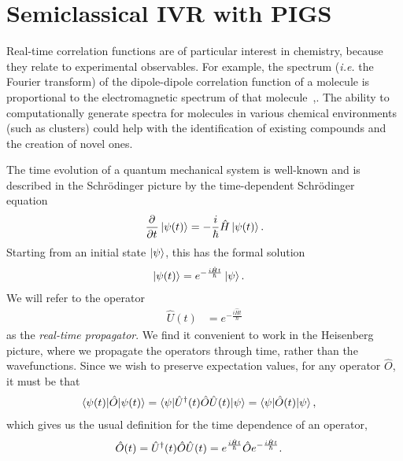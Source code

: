 \chapter{Semiclassical IVR with PIGS}

\label{chap:semiclassical}

Real-time correlation functions are of particular interest in chemistry, because they relate to experimental observables.
For example, the spectrum (\textit{i.e.} the Fourier transform) of the dipole-dipole correlation function of a molecule is proportional to the electromagnetic spectrum of that molecule~\cite[12,56]{zwanzig2001nonequilibrium},\cite[473]{mcquarrie1976statistical}.
The ability to computationally generate spectra for molecules in various chemical environments (such as clusters) could help with the identification of existing compounds and the creation of novel ones.

The time evolution of a quantum mechanical system is well-known and is described in the Schrödinger picture by the time-dependent Schrödinger equation~\cite[111]{dirac1981principles}
\begin{align}
	\dpd{}{t} \ket{\psi(t)} = -\frac{i}{\hbar} \hat{H} \ket{\psi(t)}.
\end{align}
Starting from an initial state $\ket{\psi}$, this has the formal solution
\begin{align}
	\ket{\psi(t)}
	&= e^{-\frac{i \hat{H} t}{\hbar}} \ket{\psi}.
\end{align}
We will refer to the operator
\begin{align}
	\hat{U}(t)
	&= e^{-\frac{i \hat{H} t}{\hbar}}
\end{align}
as the \emph{real-time propagator}.
We find it convenient to work in the Heisenberg picture, where we propagate the operators through time, rather than the wavefunctions.
Since we wish to preserve expectation values, for any operator $\hat{O}$, it must be that
\begin{align}
	\braket{\psi(t) | \hat{O} | \psi(t)}
	&= \braket{\psi | \hat{U}^\dagger(t) \hat{O} \hat{U}(t) | \psi}
	= \braket{\psi | \hat{O}(t) | \psi},
\end{align}
which gives us the usual definition for the time dependence of an operator,~\cite[315]{messiah1999quantum}
\begin{align}
	\hat{O}(t)
	&= \hat{U}^\dagger(t) \hat{O} \hat{U}(t)
	= e^{\frac{i \hat{H} t}{\hbar}} \hat{O} e^{-\frac{i \hat{H} t}{\hbar}}.
\end{align}

